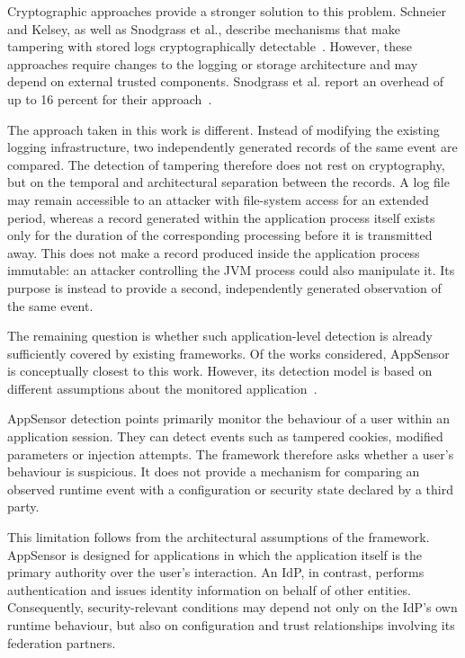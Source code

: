 \documentclass[../main.tex]{subfiles}
\begin{document}
Cryptographic approaches provide a stronger solution to this problem. 
Schneier and Kelsey, as well as Snodgrass et al., describe mechanisms that make tampering with 
stored logs cryptographically detectable~\cite{CryptoSupportSecureLogs, TamperDetection}. 
However, these approaches require changes to the logging or storage architecture and may depend 
on external trusted components. 
Snodgrass et al. report an overhead of up to 16 percent for their approach~\cite{TamperDetection}.

The approach taken in this work is different. 
Instead of modifying the existing logging infrastructure, two independently generated records 
of the same event are compared. 
The detection of tampering therefore does not rest on cryptography, but on the temporal and 
architectural separation between the records. 
A log file may remain accessible to an attacker with file-system access for an extended period, 
whereas a record generated within the application process itself exists only for the duration of 
the corresponding processing before it is transmitted away. 
This does not make a record produced inside the application process immutable: an attacker 
controlling the JVM process could also manipulate it. 
Its purpose is instead to provide a second, independently generated observation of the same 
event.

The remaining question is whether such application-level detection is already sufficiently 
covered by existing frameworks. 
Of the works considered, AppSensor is conceptually closest to this work. 
However, its detection model is based on different assumptions about the monitored 
application~\cite{OWASPAppSensor}.

AppSensor detection points primarily monitor the behaviour of a user within an application 
session. 
They can detect events such as tampered cookies, modified parameters or injection attempts. 
The framework therefore asks whether a user's behaviour is suspicious. 
It does not provide a mechanism for comparing an observed runtime event with a configuration 
or security state declared by a third party.

This limitation follows from the architectural assumptions of the framework. 
AppSensor is designed for applications in which the application itself is the primary authority 
over the user's interaction. 
An IdP, in contrast, performs authentication and issues identity information on behalf of other 
entities. 
Consequently, security-relevant conditions may depend not only on the IdP's own runtime 
behaviour, but also on configuration and trust relationships involving its federation partners.
\end{document}
